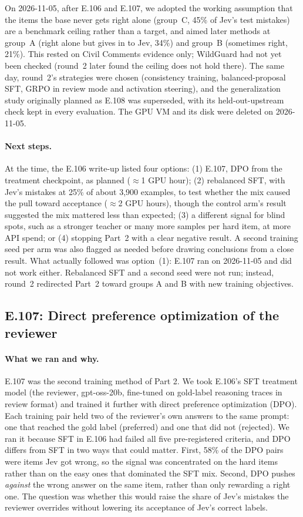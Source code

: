 \documentclass[11pt]{article}
\renewcommand{\_}{\origunderscore\allowbreak}
\begin{document}
On 2026-11-05, after E.106 and E.107, we adopted the working assumption that the items the base never gets right alone (group~C, 45\% of Jev's test mistakes) are a benchmark ceiling rather than a target, and aimed later methods at group~A (right alone but gives in to Jev, 34\%) and group~B (sometimes right, 21\%). This rested on Civil Comments evidence only; WildGuard had not yet been checked (round~2 later found the ceiling does not hold there). The same day, round~2's strategies were chosen (consistency training, balanced-proposal SFT, GRPO in review mode and activation steering), and the generalization study originally planned as E.108 was superseded, with its held-out-upstream check kept in every evaluation. The GPU VM and its disk were deleted on 2026-11-05.

\paragraph{Next steps.}
At the time, the E.106 write-up listed four options: (1) E.107, DPO from the treatment checkpoint, as planned ($\approx$1 GPU hour); (2) rebalanced SFT, with Jev's mistakes at 25\% of about 3,900 examples, to test whether the mix caused the pull toward acceptance ($\approx$2 GPU hours), though the control arm's result suggested the mix mattered less than expected; (3) a different signal for blind spots, such as a stronger teacher or many more samples per hard item, at more API spend; or (4) stopping Part~2 with a clear negative result. A second training seed per arm was also flagged as needed before drawing conclusions from a close result. What actually followed was option~(1): E.107 ran on 2026-11-05 and did not work either. Rebalanced SFT and a second seed were not run; instead, round~2 redirected Part~2 toward groups A and B with new training objectives.

\subsection{E.107: Direct preference optimization of the reviewer}\label{sec:e107}

\paragraph{What we ran and why.}
E.107 was the second training method of Part 2. We took E.106's SFT treatment model (the reviewer, gpt-oss-20b, fine-tuned on gold-label reasoning traces in review format) and trained it further with direct preference optimization (DPO). Each training pair held two of the reviewer's own answers to the same prompt: one that reached the gold label (preferred) and one that did not (rejected). We ran it because SFT in E.106 had failed all five pre-registered criteria, and DPO differs from SFT in two ways that could matter. First, 58\% of the DPO pairs were items Jev got wrong, so the signal was concentrated on the hard items rather than on the easy ones that dominated the SFT mix. Second, DPO pushes \emph{against} the wrong answer on the same item, rather than only rewarding a right one. The question was whether this would raise the share of Jev's mistakes the reviewer overrides without lowering its acceptance of Jev's correct labels.
\end{document}
